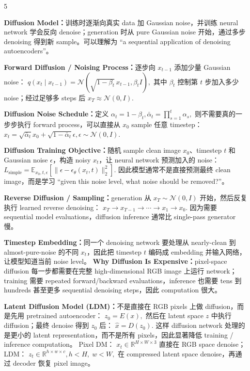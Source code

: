 \documentclass[a4paper, landscape]{article}
\begin{document}
\begin{multicols}{5}
\par \textbf{Diffusion Model：}训练时逐渐向真实 data 加 Gaussian noise，并训练 neural network 学会反向 denoise；generation 时从 pure Gaussian noise 开始，通过多步 denoising 得到新 sample。可以理解为 ``a sequential application of denoising autoencoders''。

\par \textbf{Forward Diffusion / Noising Process：}逐步向 \(x_{t-1}\) 添加少量 Gaussian noise：
\(
q(x_t\mid x_{t-1})
=
\mathcal N
\left(
\sqrt{1-\beta_t}\,x_{t-1},
\beta_tI
\right),
\)
其中 \(\beta_t\) 控制第 \(t\) 步加入多少 noise；经过足够多 steps 后
\(
x_T\approx\mathcal N(0,I).
\)

\par \textbf{Diffusion Noise Schedule：}定义
\(
\alpha_t=1-\beta_t,
\bar\alpha_t=\prod_{s=1}^{t}\alpha_s,
\)
则不需要真的一步步执行 forward process，可以直接从 \(x_0\) sample 任意 timestep：
\(
x_t
=
\sqrt{\bar\alpha_t}x_0+
\sqrt{1-\bar\alpha_t}\epsilon,
\epsilon\sim\mathcal N(0,I).
\)

\par \textbf{Diffusion Training Objective：}随机 sample clean image \(x_0\)、timestep \(t\) 和 Gaussian noise \(\epsilon\)，构造 noisy \(x_t\)，让 neural network 预测加入的 noise：
\(
L_{\mathrm{simple}}
=
\mathbb E_{x_0,t,\epsilon}
\left[
\|\epsilon-\epsilon_\theta(x_t,t)\|_2^2
\right].
\)
因此模型通常不是直接预测最终 clean image，而是学习 ``given this noise level, what noise should be removed?''。

\par \textbf{Reverse Diffusion / Sampling：}generation 从
\(
x_T\sim\mathcal N(0,I)
\)
开始，然后反复执行 learned reverse denoising：
\(
x_T\rightarrow x_{T-1}\rightarrow\cdots\rightarrow x_1\rightarrow x_0.
\)
因为需要 sequential model evaluations，diffusion inference 通常比 single-pass generator 慢。

\par \textbf{Timestep Embedding：}同一个 denoising network 要处理从 nearly-clean 到 almost-pure-noise 的不同 \(x_t\)，因此把 timestep \(t\) 编码成 embedding 并输入网络，让模型知道当前 noise level。
\textbf{Why Diffusion Is Expensive：}pixel-space diffusion 每一步都需要在完整 high-dimensional RGB image 上运行 network；training 需要 repeated forward/backward evaluations，inference 也需要 tens 到 hundreds 甚至更多 sequential denoising steps，因此 computation 很大。

\par \textbf{Latent Diffusion Model (LDM)：}不是直接在 RGB pixels 上做 diffusion，而是先用 pretrained autoencoder：
\(
z_0=E(x),
\)
然后在 latent space \(z\) 中执行 diffusion；最终 denoise 得到 \(z_0\) 后：
\(
\hat x=D(z_0).
\)
这样 diffusion network 处理的是更小的 latent representation，而不是所有 pixels，因此显著降低 training / inference computation。
Pixel DM：
\(
x_t\in\mathbb R^{H\times W\times3}
\)
直接在 RGB space denoise；LDM：
\(
z_t\in\mathbb R^{h\times w\times c},
 h<H,\;w<W,
\)
在 compressed latent space denoise，再通过 decoder 恢复 pixel image。


\end{multicols}
\end{document}
